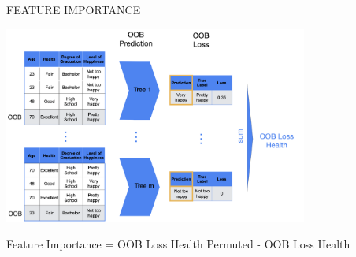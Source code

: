 \documentclass[11pt,compress,t,notes=noshow, xcolor=table]{beamer}
\begin{document}
\begin{vbframe}{FEATURE IMPORTANCE}
\begin{center}
    \includegraphics[width = 0.75\textwidth]{slides/forests/figure_man/nutshell-randomforest-OOB_2.png}
\end{center}

\vspace{0.5cm}
\begin{center}
Feature Importance = OOB Loss Health Permuted - OOB Loss Health
\end{center}
\end{vbframe}




\endlecture
\end{document}
